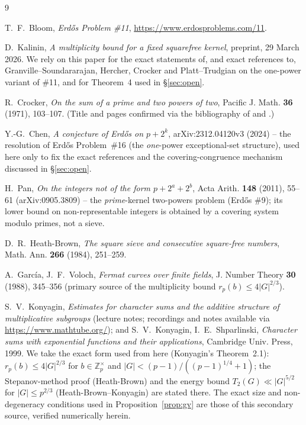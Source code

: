 \documentclass[11pt]{article}
\theoremstyle{plain}
\theoremstyle{definition}
\theoremstyle{remark}
\newcommand{\Z}{\mathbb{Z}}
\begin{document}
\begin{thebibliography}{9}

T.~F.~Bloom, \emph{Erd\H{o}s Problem \#11},
\url{https://www.erdosproblems.com/11}.

D.~Kalinin, \emph{A multiplicity bound for a fixed squarefree kernel}, preprint,
29 March 2026. We rely on this paper for the exact statements of, and exact
references to, Granville--Soundararajan, Hercher, Crocker and
Platt--Trudgian on the one-power variant of \#11, and for Theorem~4 used in
\S\ref{sec:open}.

R.~Crocker, \emph{On the sum of a prime and two powers of two}, Pacific J.
Math. \textbf{36} (1971), 103--107. (Title and pages confirmed via the
bibliography of \cite{Chen2024} and \cite{Pan2011}.)

Y.-G.~Chen, \emph{A conjecture of Erd\H{o}s on $p+2^k$}, arXiv:2312.04120v3
(2024) -- the resolution of Erd\H{o}s Problem~\#16 (the \emph{one}-power
exceptional-set structure), used here only to fix the exact references and the
covering-congruence mechanism discussed in \S\ref{sec:open}.

H.~Pan, \emph{On the integers not of the form $p+2^a+2^b$}, Acta Arith.
\textbf{148} (2011), 55--61 (arXiv:0905.3809) -- the \emph{prime}-kernel
two-powers problem (Erd\H{o}s \#9); its lower bound on non-representable
integers is obtained by a covering system modulo primes, not a sieve.

D.~R.~Heath-Brown, \emph{The square sieve and consecutive square-free numbers},
Math. Ann. \textbf{266} (1984), 251--259.

A.~García, J.~F.~Voloch, \emph{Fermat curves over finite fields}, J. Number
Theory \textbf{30} (1988), 345--356 (primary source of the multiplicity bound
$r_p(b)\le4|G|^{2/3}$).

S.~V.~Konyagin, \emph{Estimates for character sums and the additive structure of
multiplicative subgroups} (lecture notes; recordings and notes available via
\url{https://www.mathtube.org/}); and S.~V.~Konyagin, I.~E.~Shparlinski,
\emph{Character sums with exponential functions and their applications}, Cambridge
Univ. Press, 1999. We take the exact form used from here (Konyagin's Theorem~2.1):
$r_p(b)\le4|G|^{2/3}$ for $b\in\Z_p^\times$ and $|G|<(p-1)/((p-1)^{1/4}+1)$; the
Stepanov-method proof (Heath-Brown) and the energy bound $T_2(G)\ll|G|^{5/2}$ for
$|G|\le p^{2/3}$ (Heath-Brown--Konyagin) are stated there. The exact size and
non-degeneracy conditions used in Proposition~\ref{prop:gv} are those of this
secondary source, verified numerically herein.


\end{thebibliography}
\end{document}
